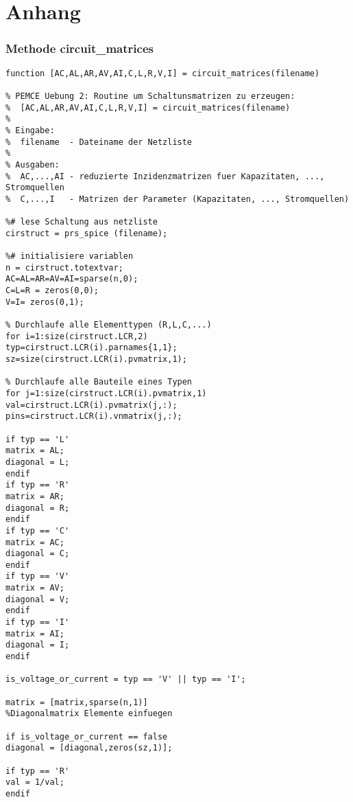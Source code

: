 \chapter{Anhang}\label{sec:anhang}
\subsection*{Methode circuit\_matrices}
\begin{lstlisting}[caption={Methode \texttt{circuit\_matrices} in Octave}, label=circuit_matrices]
function [AC,AL,AR,AV,AI,C,L,R,V,I] = circuit_matrices(filename)

% PEMCE Uebung 2: Routine um Schaltunsmatrizen zu erzeugen:
%  [AC,AL,AR,AV,AI,C,L,R,V,I] = circuit_matrices(filename)
%
% Eingabe:
%  filename  - Dateiname der Netzliste
%
% Ausgaben:
%  AC,...,AI - reduzierte Inzidenzmatrizen fuer Kapazitaten, ..., Stromquellen
%  C,...,I   - Matrizen der Parameter (Kapazitaten, ..., Stromquellen)

%# lese Schaltung aus netzliste
cirstruct = prs_spice (filename);

%# initialisiere variablen
n = cirstruct.totextvar;
AC=AL=AR=AV=AI=sparse(n,0);
C=L=R = zeros(0,0);
V=I= zeros(0,1);

% Durchlaufe alle Elementtypen (R,L,C,...)
for i=1:size(cirstruct.LCR,2)
typ=cirstruct.LCR(i).parnames{1,1};
sz=size(cirstruct.LCR(i).pvmatrix,1);

% Durchlaufe alle Bauteile eines Typen
for j=1:size(cirstruct.LCR(i).pvmatrix,1)
val=cirstruct.LCR(i).pvmatrix(j,:);
pins=cirstruct.LCR(i).vnmatrix(j,:);

if typ == 'L'
matrix = AL;
diagonal = L;
endif 
if typ == 'R'
matrix = AR;
diagonal = R;
endif 
if typ == 'C'
matrix = AC;
diagonal = C;
endif 
if typ == 'V'
matrix = AV;
diagonal = V;
endif  
if typ == 'I'
matrix = AI;
diagonal = I;  
endif

is_voltage_or_current = typ == 'V' || typ == 'I';

matrix = [matrix,sparse(n,1)]
%Diagonalmatrix Elemente einfuegen

if is_voltage_or_current == false
diagonal = [diagonal,zeros(sz,1)];

if typ == 'R'
val = 1/val;
endif


\end{lstlisting}
